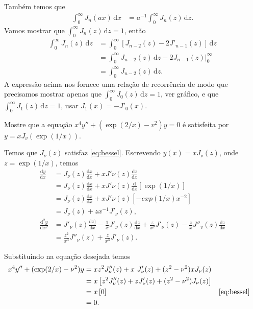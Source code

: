 \documentclass[a4paper,12pt, leqno, answers]{exam}
\begin{document}
\begin{questions}
\begin{solution}
        Tamb\'{e}m temos que
        \begin{align*}
            \int_0^\infty J_n(a x) \,\mathrm{d}x &= a^{-1} \int_0^\infty J_n(z) \,\mathrm{d}z.
        \end{align*}
        Vamos mostrar que $\int_0^\infty J_n(z) \,\mathrm{d}z = 1$, ent\~{a}o
        \begin{align*}
            \int_0^\infty J_n(z) \,\mathrm{d}z &= \int_0^\infty \left[ J_{n - 2}(z) - 2 J'_{n - 1}(z) \right] \,\mathrm{d}z \\
            &= \int_0^\infty J_{n - 2}(z) \,\mathrm{d}z - \left. 2 J_{n - 1}(z) \right|_0^\infty \\
            &= \int_0^\infty J_{n - 2}(z) \,\mathrm{d}z.
        \end{align*}
        A express\~{a}o acima nos fornece uma rela\c{c}\~{a}o de recorr\^{e}ncia de modo que precisamos mostrar apenas que $\int_0^\infty J_0(z) \,\mathrm{d}z = 1$, ver gr\'{a}fico, e que $\int_0^\infty J_1(z) \,\mathrm{d}z = 1$, usar $J_1(x) = - J'_0(x)$.
    \end{solution}

    \question Mostre que a equa\c{c}\~{a}o $x^4 y'' + (\exp(2/x) - v^2)y = 0$ \'{e} satisfeita por $y = x J_v(\exp(1/x))$.
    \begin{solution}
        Temos que $J_\nu(z)$ satisfaz \eqref{eq:bessel}. Escrevendo $y(x) = x J_\nu(z)$, onde $z = \exp(1/x)$, temos
        \begin{align*}
            \frac{\mathrm{d}y}{\mathrm{d}x} &= J_\nu(z) \frac{\mathrm{d}x}{\mathrm{d}x} + x J'\nu(z) \frac{\mathrm{d}z}{\mathrm{d}x} \\
            &= J_\nu(z) \frac{\mathrm{d}x}{\mathrm{d}x} + x J'\nu(z) \frac{\mathrm{d}}{\mathrm{d}x}\left[ \exp(1/x) \right] \\
            &= J_\nu(z) \frac{\mathrm{d}x}{\mathrm{d}x} + x J'\nu(z) \left[ -exp(1/x) x^{-2} \right] \\
            &= J_\nu(z) + z x^{-1} J'_\nu(z), \\
            \frac{\mathrm{d}^2y}{\mathrm{d}x^2} &= J'_\nu(z) \frac{\mathrm{d}z)}{\mathrm{d}x} - \frac{1}{x} J'_\nu(z) \frac{\mathrm{d} z}{\mathrm{d}x} + \frac{z}{x^2} J'_\nu(z) - \frac{z}{x} J''_v(z) \frac{\mathrm{d}z}{\mathrm{d}x} \\
            &= \frac{z^2}{x^3} J''_\nu(z) + \frac{z}{x^3} J'_\nu(z).
        \end{align*}

        Substituindo na equa\c{c}\~{a}o desejada temos
        \begin{align*}
            x^4 y'' + (\exp(2/x) - \nu^2) y &= x z^2 J''_\nu(z) + x \ J'_\nu(z) + (z^2 - \nu^2) x J_\nu(z) \\
            &= x \left[ z^2 J''_\nu(z) + z J'_\nu(z) + (z^2 - \nu^2) J_\nu(z) \right] \\
            &= x \left[ 0 \right] && \eqref{eq:bessel} \\
            &= 0.
        \end{align*}
    \end{solution}


\end{questions}
\end{document}
